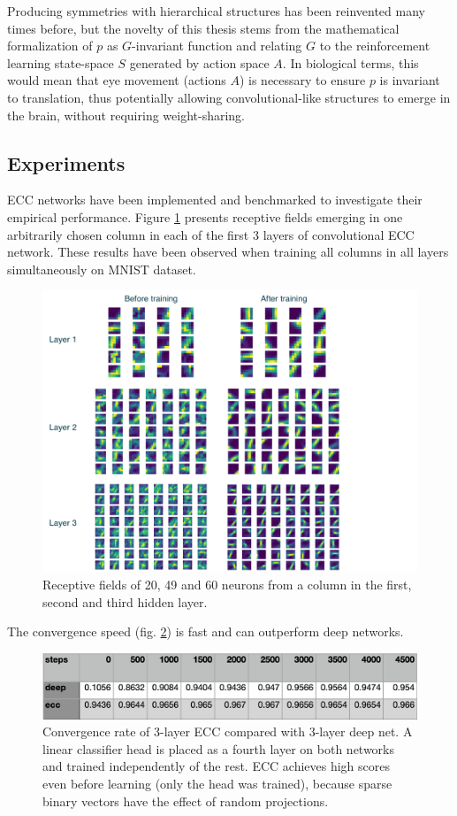 \documentclass[12pt]{article}
\begin{document}
Producing symmetries with hierarchical structures has been reinvented many times before, but the novelty of this thesis stems from the mathematical formalization of $p$ as $G$-invariant function and relating $G$ to the reinforcement learning state-space $S$ generated by action space $A$. In biological terms, this would mean that eye movement (actions $A$) is necessary to ensure $p$ is invariant to translation, thus potentially allowing convolutional-like structures to emerge in the brain, without requiring weight-sharing.


\subsection{Experiments}

ECC networks have been implemented and benchmarked to investigate their empirical performance. Figure \ref{fig:receptive_fields} presents receptive fields emerging in one arbitrarily chosen column in each of the first 3 layers of convolutional ECC network. These results have been observed when training all columns in all layers simultaneously on MNIST dataset. 
\begin{figure}[!htbp]
	\centering
	\includegraphics[width=15cm]{receptive_fields}
	\caption{Receptive fields of 20, 49 and 60 neurons from a column in the first, second and third hidden layer.}
	\label{fig:receptive_fields}
\end{figure} 
The convergence speed (fig. \ref{fig:convergence_rate}) is fast and can outperform deep networks.
\begin{figure}[!htbp]
	\centering
	\includegraphics[width=13.5cm]{convergence_rate}
	\caption{Convergence rate of 3-layer ECC compared with 3-layer deep net. A linear classifier head is placed as a fourth layer on both networks and trained independently of the rest. ECC achieves high scores even before learning (only the head was trained), because sparse binary vectors have the effect of random projections.}
	\label{fig:convergence_rate}
\end{figure} 
\end{document}
